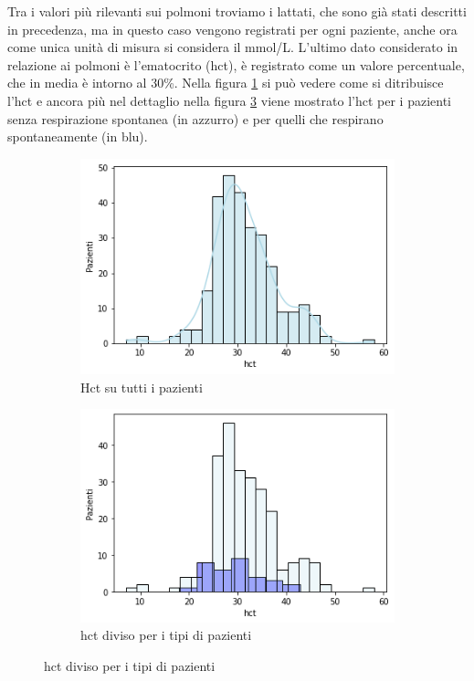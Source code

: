 Tra i valori più rilevanti sui polmoni troviamo i lattati, che sono già stati descritti in precedenza, ma in questo caso vengono registrati per ogni paziente, anche ora come unica unità di misura si considera il mmol/L.
L'ultimo dato considerato in relazione ai polmoni è l'ematocrito (hct), è registrato come un valore percentuale, che in media è intorno al 30\%.
Nella figura \ref{fig:hct} si può vedere come si ditribuisce l'hct e ancora più nel dettaglio nella figura \ref{fig:hct1} viene mostrato l'hct per i pazienti senza respirazione spontanea (in azzurro) e per quelli che respirano spontaneamente (in blu).


\begin{figure}[h]
	\begin{subfigure}{.5\textwidth}
		\centering
		\includegraphics[width=.8\linewidth]{capitolo1/hct.png}
		\caption{Hct su tutti i pazienti}
		\label{fig:hct}
	\end{subfigure}%
	\begin{subfigure}{.5\textwidth}
		\centering
		\includegraphics[width=.8\linewidth]{capitolo1/hct1.png}
		\caption{hct diviso per i tipi di pazienti}
		\label{fig:hct1}
	\end{subfigure}
\end{figure}



